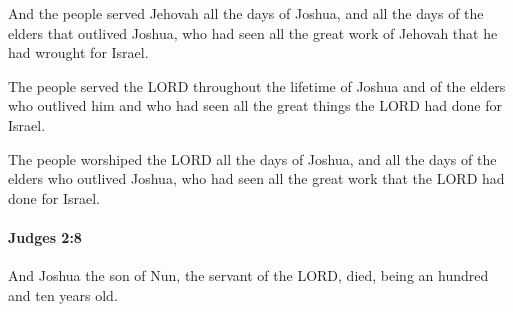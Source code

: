 			\begin{versebox}
					\item[BHS] 
					\item[ASV] And the people served Jehovah all the days of Joshua, and all the days of the elders that outlived Joshua, who had seen all the great work of Jehovah that he had wrought for Israel.
					\item[NIV] The people served the LORD throughout the lifetime of Joshua and of the elders who outlived him and who had seen all the great things the LORD had done for Israel.
					\item[NRSV] The people worshiped the LORD all the days of Joshua, and all the days of the elders who outlived Joshua, who had seen all the great work that the LORD had done for Israel.
			\end{versebox}

		\paragraph{Judges 2:8} %
			\label{JUDGES-2-8}

			And Joshua the son of Nun, the servant of the LORD, died, being an hundred and ten years old.

